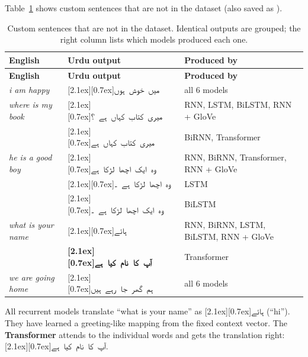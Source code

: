 \documentclass[11pt,a4paper]{article}
\newcommand{\best}[1]{\textbf{\textcolor{cKey}{#1}}}
\newcommand{\ur}[1]{\mbox{\raisebox{0pt}[2.1ex][0.7ex]{\texturdu{#1}}}}
\begin{document}
\medskip
Table~\ref{tab:custom} shows custom sentences that are not in the dataset (also saved as ).

\begin{center}\small
\begin{longtable}{@{}p{3.3cm}>{\raggedleft\arraybackslash}p{4.6cm}p{6.6cm}@{}}
\caption{Custom sentences that are not in the dataset. Identical outputs are grouped; the right column lists which models produced each one.}\label{tab:custom}\\
\toprule \textbf{English} & \textbf{Urdu output} & \textbf{Produced by}\\ \midrule \endfirsthead
\toprule \textbf{English} & \textbf{Urdu output} & \textbf{Produced by}\\ \midrule \endhead
\bottomrule \endfoot
\textit{i am happy} & \ur{میں خوش ہوں} & all 6 models\\
\midrule
\textit{where is my book} & \ur{میری کتاب کہاں ہے ؟} & \textcolor{cBase}{RNN}, \textcolor{cModel}{LSTM}, \textcolor{cModel}{BiLSTM}, \textcolor{cData}{RNN + GloVe}\\
 & \ur{میری کتاب کہاں ہے} & \textcolor{cBase}{BiRNN}, \textcolor{cKey}{Transformer}\\
\midrule
\textit{he is a good boy} & \ur{وہ ایک اچھا لڑکا ہے} & \textcolor{cBase}{RNN}, \textcolor{cBase}{BiRNN}, \textcolor{cKey}{Transformer}, \textcolor{cData}{RNN + GloVe}\\
 & \ur{وہ اچھا لڑکا ہے ۔} & \textcolor{cModel}{LSTM}\\
 & \ur{وہ ایک اچھا لڑکا ہے ۔} & \textcolor{cModel}{BiLSTM}\\
\midrule
\textit{what is your name} & \ur{ہائے} & \textcolor{cBase}{RNN}, \textcolor{cBase}{BiRNN}, \textcolor{cModel}{LSTM}, \textcolor{cModel}{BiLSTM}, \textcolor{cData}{RNN + GloVe}\\
 & \best{\ur{آپ کا نام کیا ہے}} & \textcolor{cKey}{Transformer}\\
\midrule
\textit{we are going home} & \ur{ہم گھر جا رہے ہیں} & all 6 models\\
\end{longtable}
\end{center}

\begin{keybox}
All recurrent models translate ``what is your name'' as \ur{ہائے} (``hi'').
They have learned a greeting-like mapping from the fixed context vector.
The \best{Transformer} attends to the individual words and gets the translation right: \ur{آپ کا نام کیا ہے}.
\end{keybox}
\end{document}
